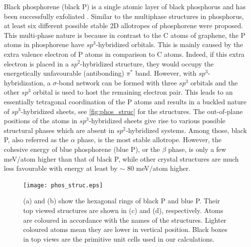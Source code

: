 Black phosphorene (black P) is a single atomic layer of black phosphorus and has been successfully exfoliated \cite{Han2014,Li2014}. Similar to the multiphase structures in phosphorus, at least six different possible stable 2D allotropes of phosphorene were proposed\cite{Zhu2014,Guan2014a,Wu2015}. This multi-phase nature is because in contrast to the C atoms of graphene, the P atoms in phosphorene have $sp^3$-hybridized orbitals. This is mainly caused by the extra valence electron of P atoms in comparison to C atoms. Indeed, if this extra electron is placed in a $sp^2$-hybridized structure, they would occupy the energetically unfavourable (antibonding) $\pi^*$ band. However, with $sp^3$-hybridization, a $\sigma$-bond network can be formed with three $sp^3$ orbitals and the other $sp^3$ orbital is used to host the remaining electron pair. This leads to an essentially tetragonal coordination of the P atoms and results in a buckled nature of $sp^3$-hybridized sheets, see \autoref{fig:phos_struc} for the structures. The out-of-plane positions of the atoms in $sp^3$-hybridized sheets give rise to various possible structural phases which are absent in $sp^2$-hybridized systems. Among those, black P, also referred as the $\alpha$ phase, is the most stable allotrope. However, the cohesive energy of blue phosphorene (blue P), or the $\beta$ phase, is only a few meV/atom higher than that of black P, while other crystal structures are much less favourable with energy at least by $\sim$ 80 meV/atom higher.  

\begin{figure}[htbp] 
\centering
\texttt{[image: phos\_struc.eps]}%
\caption[Black and blue phosphorene structures]{(a) and (b) show the hexagonal rings of black P and blue P. Their top viewed structures are shown in (c) and (d), respectively. Atoms are coloured in accordance with the names of the structures. Lighter coloured atoms mean they are lower in vertical position. Black boxes in top views are the primitive unit cells used in our calculations. }
\label{fig:phos_struc}
\end{figure}

